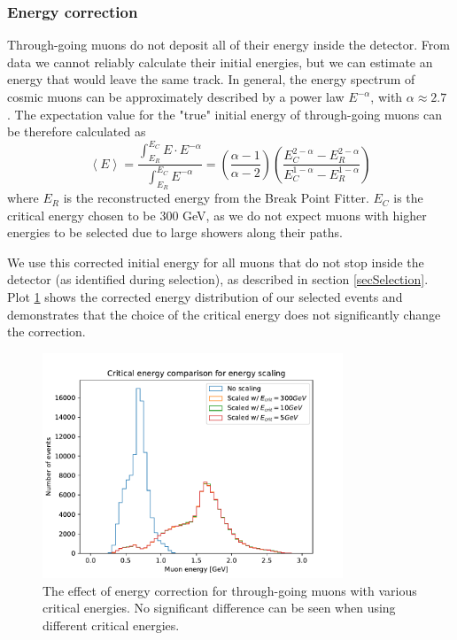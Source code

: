 \documentclass[12pt]{article}
\begin{document}
\subsubsection{Energy correction}
Through-going muons do not deposit all of their energy inside the detector. From data we cannot reliably calculate their initial energies, but we can estimate an energy that would leave the same track. In general, the energy spectrum of cosmic muons can be approximately described by a power law $E^{-\alpha}$, with $\alpha\approx2.7$ \cite{NOVA-doc-51327-v3,rpp2022-rev-cosmic-rays.pdf}. The expectation value for the "true" initial energy of through-going muons can be therefore calculated as
\begin{equation}
\left\langle E\right\rangle =\frac{\int^{E_C}_{E_R} E\cdot E^{-\alpha}}{\int^{E_C}_{E_R} E^{-\alpha}}=\left(\frac{\alpha -1}{\alpha -2}\right)\left(\frac{E_C^{2-\alpha}-E_R^{2-\alpha}}{E_C^{1-\alpha}-E_R^{1-\alpha}}\right)
\end{equation}
where $E_R$ is the reconstructed energy from the Break Point Fitter. $E_C$ is the critical energy chosen to be 300 GeV, as we do not expect muons with higher energies to be selected due to large showers along their paths.

We use this corrected initial energy for all muons that do not stop inside the detector (as identified during selection), as described in section \ref{secSelection}. Plot \ref{figEnergyScaling} shows the corrected energy distribution of our selected events and demonstrates that the choice of the critical energy does not significantly change the correction. 

\begin{figure}[hbtp]
\centering
\includegraphics[width=0.8\textwidth]{ECritComparison.pdf}
\caption{The effect of energy correction for through-going muons with various critical energies. No significant difference can be seen when using different critical energies.}
\label{figEnergyScaling}
\end{figure}
\end{document}
